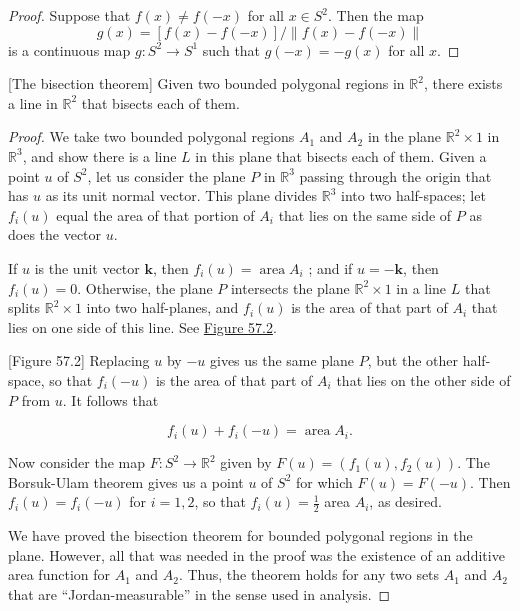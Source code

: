 \begin{proof}
Suppose that \(f(x) \neq f( {-x})\) for all \(x \in {S}^{2}\). Then the map
\[
g(x) = [ {f(x) - f( {-x}) }] /\parallel f(x) - f( {-x}) \parallel
\]
is a continuous map \(g : S^{2} \rightarrow {S}^{1}\) such that \(g( {-x}) = - g(x)\) for all \(x\).
\end{proof}
\begin{theorem}
\label{thm:\thetheorem}[The bisection theorem]
Given two bounded polygonal regions in \(\mathbb{R}^{2}\), there exists a line in \(\mathbb{R}^{2}\) that bisects each of them.
\end{theorem}

\begin{proof}
We take two bounded polygonal regions \(A_{1}\) and \(A_{2}\) in the plane \(\mathbb{R}^{2} \times 1\) in \(\mathbb{R}^{3}\), and show there is a line \(L\) in this plane that bisects each of them.
Given a point \(u\) of \(S^{2}\), let us consider the plane \(P\) in \(\mathbb{R}^{3}\) passing through the origin that has \(u\) as its unit normal vector. This plane divides \(\mathbb{R}^{3}\) into two half-spaces; let \(f_{i}( u)\) equal the area of that portion of \(A_{i}\) that lies on the same side of \(P\) as does the vector \(u\).

If \(u\) is the unit vector \(\mathbf{k}\), then \(f_{i}( u) = \operatorname{area}A_{i}\) ; and if \(u = - \mathbf{k}\), then \(f_{i}( u) = 0\). Otherwise, the plane \(P\) intersects the plane \(\mathbb{R}^{2} \times 1\) in a line \(L\) that splits \(\mathbb{R}^{2} \times 1\) into two half-planes, and \(f_{i}( u)\) is the area of that part of \(A_{i}\) that lies on one side of this line. See \hyperref[fig:57.2]{Figure 57.2}.

[Figure 57.2]
Replacing \(u\) by \(- u\) gives us the same plane \(P\), but the other half-space, so that \(f_{i}( {-u})\) is the area of that part of \(A_{i}\) that lies on the other side of \(P\) from \(u\). It follows that

\[
f_{i}( u) + f_{i}( {-u}) = \operatorname{area}A_{i}.
\]

Now consider the map \(F : S^{2} \rightarrow {\mathbb{R}}^{2}\) given by \(F( u) = ( {f_{1}( u),f_{2}( u) })\). The Borsuk-Ulam theorem gives us a point \(u\) of \(S^{2}\) for which \(F( u) = F( {-u})\). Then \(f_{i}( u) = f_{i}( {-u})\) for \(i = 1,2\), so that \(f_{i}( u) = \frac{1}{2}\) area \(A_{i}\), as desired.

We have proved the bisection theorem for bounded polygonal regions in the plane. However, all that was needed in the proof was the existence of an additive area function for \(A_{1}\) and \(A_{2}\). Thus, the theorem holds for any two sets \(A_{1}\) and \(A_{2}\) that are ``Jordan-measurable'' in the sense used in analysis.


\end{proof}
